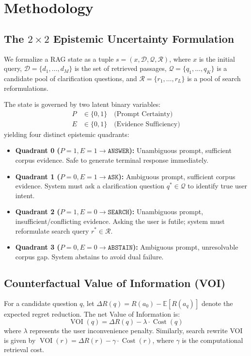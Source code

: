 \section{Methodology}
\label{sec:methodology}

\subsection{The $2 \times 2$ Epistemic Uncertainty Formulation}
We formalize a RAG state as a tuple $s = (x, \mathcal{D}, \mathcal{Q}, \mathcal{R})$, where $x$ is the initial query, $\mathcal{D} = \{d_1, \dots, d_M\}$ is the set of retrieved passages, $\mathcal{Q} = \{q_1, \dots, q_K\}$ is a candidate pool of clarification questions, and $\mathcal{R} = \{r_1, \dots, r_L\}$ is a pool of search reformulations.

The state is governed by two latent binary variables:
\begin{align}
    P &\in \{0, 1\} \quad \text{(Prompt Certainty)} \\
    E &\in \{0, 1\} \quad \text{(Evidence Sufficiency)}
\end{align}
yielding four distinct epistemic quadrants:
\begin{itemize}
    \item \textbf{Quadrant 0 ($P=1, E=1 \to \texttt{ANSWER}$):} Unambiguous prompt, sufficient corpus evidence. Safe to generate terminal response immediately.
    \item \textbf{Quadrant 1 ($P=0, E=1 \to \texttt{ASK}$):} Ambiguous prompt, sufficient corpus evidence. System must ask a clarification question $q^* \in \mathcal{Q}$ to identify true user intent.
    \item \textbf{Quadrant 2 ($P=1, E=0 \to \texttt{SEARCH}$):} Unambiguous prompt, insufficient/conflicting evidence. Asking the user is futile; system must reformulate search query $r^* \in \mathcal{R}$.
    \item \textbf{Quadrant 3 ($P=0, E=0 \to \texttt{ABSTAIN}$):} Ambiguous prompt, unresolvable corpus gap. System abstains to avoid dual failure.
\end{itemize}

\subsection{Counterfactual Value of Information (VOI)}
For a candidate question $q$, let $\Delta R(q) = R(a_0) - \mathbb{E}[R(a_q)]$ denote the expected regret reduction. The net Value of Information is:
\begin{equation}
    \operatorname{VOI}(q) = \Delta R(q) - \lambda \cdot \operatorname{Cost}(q)
\end{equation}
where $\lambda$ represents the user inconvenience penalty. Similarly, search rewrite VOI is given by $\operatorname{VOI}(r) = \Delta R(r) - \gamma \cdot \operatorname{Cost}(r)$, where $\gamma$ is the computational retrieval cost.


